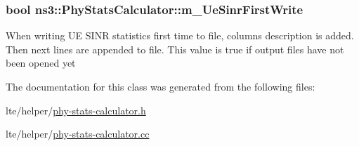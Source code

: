 \subsubsection[{\texorpdfstring{m\+\_\+\+Ue\+Sinr\+First\+Write}{m_UeSinrFirstWrite}}]{\setlength{\rightskip}{0pt plus 5cm}bool ns3\+::\+Phy\+Stats\+Calculator\+::m\+\_\+\+Ue\+Sinr\+First\+Write\hspace{0.3cm}{\ttfamily [private]}}\hypertarget{classns3_1_1PhyStatsCalculator_a07168e92564d320f8bdd827cf4a5b99d}{}\label{classns3_1_1PhyStatsCalculator_a07168e92564d320f8bdd827cf4a5b99d}
When writing UE S\+I\+NR statistics first time to file, columns description is added. Then next lines are appended to file. This value is true if output files have not been opened yet 

The documentation for this class was generated from the following files\+:\begin{DoxyCompactItemize}
\item 
lte/helper/\hyperlink{phy-stats-calculator_8h}{phy-\/stats-\/calculator.\+h}\item 
lte/helper/\hyperlink{phy-stats-calculator_8cc}{phy-\/stats-\/calculator.\+cc}\end{DoxyCompactItemize}
